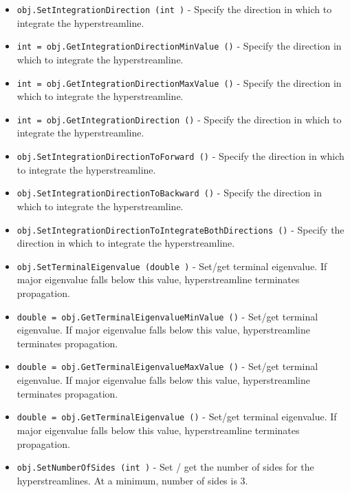 \begin{itemize}
\item  \verb|obj.SetIntegrationDirection (int )| -  Specify the direction in which to integrate the hyperstreamline.

\item  \verb|int = obj.GetIntegrationDirectionMinValue ()| -  Specify the direction in which to integrate the hyperstreamline.

\item  \verb|int = obj.GetIntegrationDirectionMaxValue ()| -  Specify the direction in which to integrate the hyperstreamline.

\item  \verb|int = obj.GetIntegrationDirection ()| -  Specify the direction in which to integrate the hyperstreamline.

\item  \verb|obj.SetIntegrationDirectionToForward ()| -  Specify the direction in which to integrate the hyperstreamline.

\item  \verb|obj.SetIntegrationDirectionToBackward ()| -  Specify the direction in which to integrate the hyperstreamline.

\item  \verb|obj.SetIntegrationDirectionToIntegrateBothDirections ()| -  Specify the direction in which to integrate the hyperstreamline.

\item  \verb|obj.SetTerminalEigenvalue (double )| -  Set/get terminal eigenvalue.  If major eigenvalue falls below this
 value, hyperstreamline terminates propagation.

\item  \verb|double = obj.GetTerminalEigenvalueMinValue ()| -  Set/get terminal eigenvalue.  If major eigenvalue falls below this
 value, hyperstreamline terminates propagation.

\item  \verb|double = obj.GetTerminalEigenvalueMaxValue ()| -  Set/get terminal eigenvalue.  If major eigenvalue falls below this
 value, hyperstreamline terminates propagation.

\item  \verb|double = obj.GetTerminalEigenvalue ()| -  Set/get terminal eigenvalue.  If major eigenvalue falls below this
 value, hyperstreamline terminates propagation.

\item  \verb|obj.SetNumberOfSides (int )| -  Set / get the number of sides for the hyperstreamlines. At a minimum,
 number of sides is 3.


\end{itemize}

